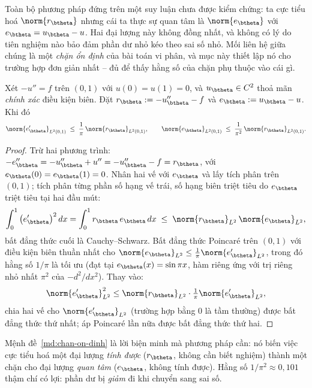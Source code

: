 Toàn bộ phương pháp đứng trên một suy luận chưa được kiểm chứng: ta cực tiểu hoá
$\norm{r_{\btheta}}$ nhưng cái ta thực sự quan tâm là $\norm{e_{\btheta}}$ với
$e_{\btheta} = u_{\btheta} - u$. Hai đại lượng này không đồng nhất, và không có
lý do tiên nghiệm nào bảo đảm phần dư nhỏ kéo theo sai số nhỏ. Mối liên hệ giữa
chúng là một \emph{chặn ổn định} của bài toán vi phân, và mục này thiết lập nó
cho trường hợp đơn giản nhất -- đủ để thấy hằng số của chặn phụ thuộc vào cái gì.
 
\begin{menhde}
\label{md:chan-on-dinh}
Xét $-u'' = f$ trên $(0,1)$ với $u(0) = u(1) = 0$, và $u_{\btheta} \in C^2$ thoả
mãn \emph{chính xác} điều kiện biên. Đặt $r_{\btheta} := -u_{\btheta}'' - f$ và
$e_{\btheta} := u_{\btheta} - u$. Khi đó
\begin{equation}
\norm{e_{\btheta}'}_{L^2(0,1)} \;\le\; \frac{1}{\pi}\,
  \norm{r_{\btheta}}_{L^2(0,1)},
\qquad
\norm{e_{\btheta}}_{L^2(0,1)} \;\le\; \frac{1}{\pi^{2}}\,
  \norm{r_{\btheta}}_{L^2(0,1)} .
\label{eq:chan-poisson}
\end{equation}
\end{menhde}
 
\begin{proof}
Trừ hai phương trình: $-e_{\btheta}'' = -u_{\btheta}'' + u'' = -u_{\btheta}'' - f
= r_{\btheta}$, với $e_{\btheta}(0) = e_{\btheta}(1) = 0$. Nhân hai vế với
$e_{\btheta}$ và lấy tích phân trên $(0,1)$; tích phân từng phần số hạng vế trái,
số hạng biên triệt tiêu do $e_{\btheta}$ triệt tiêu tại hai đầu mút:
\[
\int_0^1 \big(e_{\btheta}'\big)^2\,dx
 = \int_0^1 r_{\btheta}\, e_{\btheta}\,dx
 \;\le\; \norm{r_{\btheta}}_{L^2}\,\norm{e_{\btheta}}_{L^2},
\]
bất đẳng thức cuối là Cauchy--Schwarz. Bất đẳng thức Poincaré trên $(0,1)$ với
điều kiện biên thuần nhất cho $\norm{e_{\btheta}}_{L^2} \le
\tfrac{1}{\pi}\norm{e_{\btheta}'}_{L^2}$, trong đó hằng số $1/\pi$ là tối ưu (đạt
tại $e_{\btheta}(x) = \sin\pi x$, hàm riêng ứng với trị riêng nhỏ nhất $\pi^2$
của $-d^2/dx^2$). Thay vào:
\[
\norm{e_{\btheta}'}^2_{L^2}
 \le \norm{r_{\btheta}}_{L^2}\cdot\tfrac{1}{\pi}\norm{e_{\btheta}'}_{L^2},
\]
chia hai vế cho $\norm{e_{\btheta}'}_{L^2}$ (trường hợp bằng $0$ là tầm thường)
được bất đẳng thức thứ nhất; áp Poincaré lần nữa được bất đẳng thức thứ hai.
\end{proof}
 
Mệnh đề~\ref{md:chan-on-dinh} là lời biện minh mà phương pháp cần: nó biến việc
cực tiểu hoá một đại lượng \emph{tính được} ($r_{\btheta}$, không cần biết
nghiệm) thành một chặn cho đại lượng \emph{quan tâm} ($e_{\btheta}$, không tính
được). Hằng số $1/\pi^2 \approx 0{,}101$ thậm chí có lợi: phần dư bị \emph{giảm}
đi khi chuyển sang sai số.
 
